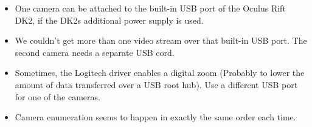 \documentclass[]{article}
\begin{document}
\begin{itemize}
\itemsep1pt\parskip0pt
\item
  One camera can be attached to the built-in USB port of the Oculus Rift
  DK2, if the DK2s additional power supply is used.
\item
  We couldn't get more than one video stream over that built-in USB
  port. The second camera needs a separate USB cord.
\item
  Sometimes, the Logitech driver enables a digital zoom (Probably to
  lower the amount of data transferred over a USB root hub). Use a
  different USB port for one of the cameras.
\item
  Camera enumeration seems to happen in exactly the same order each
  time.
\end{itemize}
\end{document}
